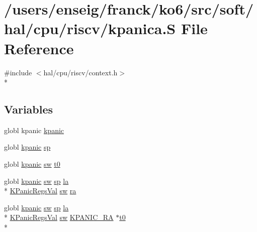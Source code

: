 \hypertarget{riscv_2kpanica_8S}{\section{/users/enseig/franck/ko6/src/soft/hal/cpu/riscv/kpanica.S File Reference}
\label{riscv_2kpanica_8S}
}
{\ttfamily \#include $<$hal/cpu/riscv/context.\-h$>$}\\*
\subsection*{Variables}
\begin{DoxyCompactItemize}
\item 
globl kpanic \hyperlink{riscv_2kpanica_8S_a7f530336b5f1563eee0a1052ea0d4a9b}{kpanic}
\item 
globl \hyperlink{kpanic_8h_af2300a4e16ba31370a9ae2920be551d5}{kpanic} \hyperlink{riscv_2kpanica_8S_ab6ec0e135d1a07114832310b5ceb21b3}{sp}
\item 
globl \hyperlink{kpanic_8h_af2300a4e16ba31370a9ae2920be551d5}{kpanic} \hyperlink{mips_2threada_8S_a0616a0b0d185f884abf396081cef7c0d}{sw} \hyperlink{riscv_2kpanica_8S_a1df44421822422311baa32ebb99fd40f}{t0}
\item 
globl \hyperlink{kpanic_8h_af2300a4e16ba31370a9ae2920be551d5}{kpanic} \hyperlink{mips_2threada_8S_a0616a0b0d185f884abf396081cef7c0d}{sw} \hyperlink{riscv_2threada_8S_acea2af8875359fa98f1fb546c9c788d9}{sp} \hyperlink{mips_2kpanica_8S_a2fb13edcab8f873099119dfe01c49d47}{la} \\*
\hyperlink{riscv_2kpanicc_8c_a0082ae414fed384bc55eb64768a5d4d6}{K\-Panic\-Regs\-Val} \hyperlink{mips_2threada_8S_a0616a0b0d185f884abf396081cef7c0d}{sw} \hyperlink{riscv_2kpanica_8S_aff57a8987ba7a69637b45e68d8edae4a}{ra}
\item 
globl \hyperlink{kpanic_8h_af2300a4e16ba31370a9ae2920be551d5}{kpanic} \hyperlink{mips_2threada_8S_a0616a0b0d185f884abf396081cef7c0d}{sw} \hyperlink{riscv_2threada_8S_acea2af8875359fa98f1fb546c9c788d9}{sp} \hyperlink{mips_2kpanica_8S_a2fb13edcab8f873099119dfe01c49d47}{la} \\*
\hyperlink{riscv_2kpanicc_8c_a0082ae414fed384bc55eb64768a5d4d6}{K\-Panic\-Regs\-Val} \hyperlink{mips_2threada_8S_a0616a0b0d185f884abf396081cef7c0d}{sw} \hyperlink{riscv_2context_8h_a4b623604b14bb9d4b056a348de761acd}{K\-P\-A\-N\-I\-C\-\_\-\-R\-A} $\ast$\hyperlink{barrier_2main_8c_a60459f5e6b5b4401ca99f3930c7f0c45}{t0} \\*

\end{DoxyCompactItemize}
